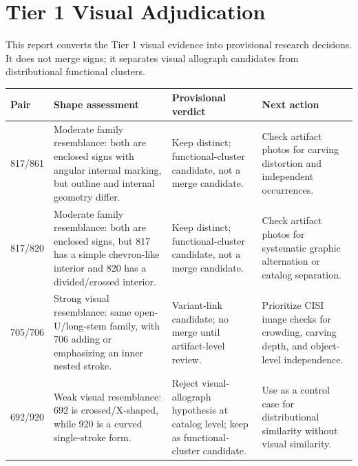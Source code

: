 ﻿\documentclass[11pt,a4paper]{article}
\begin{document}
\section*{Tier 1 Visual Adjudication}
This report converts the Tier 1 visual evidence into provisional research decisions. It does not merge signs; it separates visual allograph candidates from distributional functional clusters.
\begin{longtable}{p{}p{}p{}p{}}
\toprule
\textbf{Pair} & \textbf{Shape assessment} & \textbf{Provisional verdict} & \textbf{Next action} \\
\midrule
\endhead
817/861 & Moderate family resemblance: both are enclosed signs with angular internal marking, but outline and internal geometry differ. & Keep distinct; functional-cluster candidate, not a merge candidate. & Check artifact photos for carving distortion and independent occurrences. \\
817/820 & Moderate family resemblance: both are enclosed signs, but 817 has a simple chevron-like interior and 820 has a divided/crossed interior. & Keep distinct; functional-cluster candidate, not a merge candidate. & Check artifact photos for systematic graphic alternation or catalog separation. \\
705/706 & Strong visual resemblance: same open-U/long-stem family, with 706 adding or emphasizing an inner nested stroke. & Variant-link candidate; no merge until artifact-level review. & Prioritize CISI image checks for crowding, carving depth, and object-level independence. \\
692/920 & Weak visual resemblance: 692 is crossed/X-shaped, while 920 is a curved single-stroke form. & Reject visual-allograph hypothesis at catalog level; keep as functional-cluster candidate. & Use as a control case for distributional similarity without visual similarity. \\
\bottomrule
\end{longtable}
\end{document}
